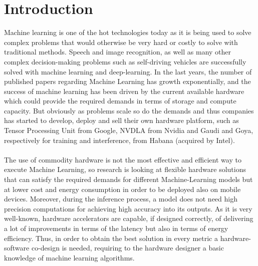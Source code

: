 \chapter{Introduction}
Machine learning is one of the hot technologies today as it is being used to solve complex problems that would otherwise be very hard or costly to solve with traditional methods. Speech and image recognition, as well as many other complex decision-making problems such as self-driving vehicles are successfully solved with machine learning and deep-learning.
In the last years, the number of published papers regarding Machine Learning has growth exponentially, and the success of machine learning has been driven by the current available hardware which could provide the required demands in terms of storage and compute capacity. But obviously as problems scale so do the demands and thus companies has started to develop, deploy and sell their own hardware platform, such as Tensor Processing Unit \cite{paper:40} from Google, NVDLA\cite{WEBSITE:6} from Nvidia and Gaudi \cite{paper:39} and Goya\cite{paper:38}, respectively for training and interference, from Habana (acquired by Intel). \\\\
The use of commodity hardware is not the most effective and efficient way to execute Machine Learning, so research is looking at flexible hardware solutions\cite{paper:1} \cite{paper:2} that can satisfy the required demands for different Machine-Learning models but at lower cost and energy consumption in order to be deployed also on mobile devices. Moreover, during the inference process, a model does not need high precision computations \cite{paper:8} \cite{paper:15}for achieving high accuracy into its outputs.
As it is very well-known, hardware accelerators are capable, if designed correctly, of delivering a lot of improvements in terms of the latency but also in terms of energy efficiency\cite{paper:29}. Thus, in order to obtain the best solution in every metric a hardware-software co-design is needed, requiring to the hardware designer a basic knowledge of machine learning algorithms.\\\\

